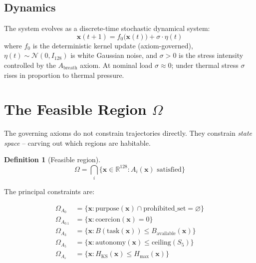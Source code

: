 \documentclass[11pt, a4paper]{article}
\newtheorem{definition}{Definition}
\newcommand{\R}{\mathbb{R}}
\newcommand{\sv}{\bm{x}}
\begin{document}
\subsection{Dynamics}

The system evolves as a discrete-time stochastic dynamical system:
\begin{equation}
  \sv(t+1) = f_0\bigl(\sv(t)\bigr) + \sigma \cdot \eta(t)
\label{eq:dynamics}
\end{equation}
where $f_0$ is the deterministic kernel update (axiom-governed),
$\eta(t) \sim \mathcal{N}(0, I_{128})$ is white Gaussian noise,
and $\sigma > 0$ is the stress intensity controlled by the $A_\text{breath}$
axiom.
At nominal load $\sigma \approx 0$; under thermal stress $\sigma$
rises in proportion to thermal pressure.


\section{The Feasible Region $\Omega$}
\label{sec:feasible}

The governing axioms do not constrain trajectories directly.
They constrain \emph{state space} -- carving out which regions are habitable.

\begin{definition}[Feasible region]
\label{def:omega}
\begin{equation}
  \Omega = \bigcap_i \bigl\{ \sv \in \R^{128} : A_i(\sv) \text{ satisfied} \bigr\}
\end{equation}
\end{definition}

The principal constraints are:

\begin{align}
  \Omega_{A_0}       &= \bigl\{ \sv : \mathrm{purpose}(\sv) \cap
                        \mathrm{prohibited\_set} = \varnothing \bigr\}
  \label{eq:a0} \\
  \Omega_{A_{0.1}}   &= \bigl\{ \sv : \mathrm{coercion}(\sv) = 0 \bigr\}
  \label{eq:a01} \\
  \Omega_{A_3}       &= \bigl\{ \sv : B(\mathrm{task}(\sv)) \le B_\text{available}(\sv) \bigr\}
  \label{eq:a3} \\
  \Omega_{A_5}       &= \bigl\{ \sv : \mathrm{autonomy}(\sv) \le \mathrm{ceiling}(S_5) \bigr\}
  \label{eq:a5} \\
  \Omega_{A_\varepsilon} &= \bigl\{ \sv : H_\text{KS}(\sv) \le H_\text{max}(\sv) \bigr\}
  \label{eq:ae}
\end{align}
\end{document}
